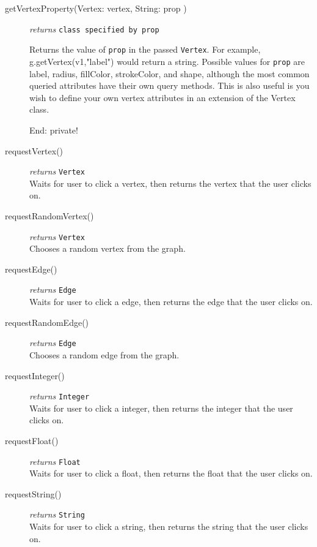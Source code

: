 \documentclass{article}
\newcounter{example}
\newlength\q
\begin{document}
\begin{description}
\item[getVertexProperty(Vertex: vertex, String: prop )]\emph{returns}
  \texttt{class specified by prop}

Returns the value of \texttt{prop} in the passed \texttt{Vertex}. For example, g.getVertex(v1,"label") would return a string. Possible values for \texttt{prop} are label, radius, fillColor, strokeColor, and shape, although the most common queried attributes have their own query methods. This is also useful is you wish to define your own vertex attributes in an extension of the Vertex class.

{\Large End: private!}

\item[requestVertex()]\emph{returns}
  \texttt{Vertex}\\
Waits for user to click a vertex, then returns the vertex that the user clicks on. 

\item[requestRandomVertex()]\emph{returns}
  \texttt{Vertex}\\
Chooses a random vertex from the graph.

\item[requestEdge()]\emph{returns}
  \texttt{Edge}\\
Waits for user to click a edge, then returns the edge that the user clicks on. 

\item[requestRandomEdge()]\emph{returns}
  \texttt{Edge}\\
Chooses a random edge from the graph.

\item[requestInteger()]\emph{returns}
  \texttt{Integer}\\
Waits for user to click a integer, then returns the integer that the user clicks on. 

\item[requestFloat()]\emph{returns}
  \texttt{Float}\\
Waits for user to click a float, then returns the float that the user clicks on. 

\item[requestString()]\emph{returns}
  \texttt{String}\\
Waits for user to click a string, then returns the string that the user clicks on. 

\end{description}
\end{document}
